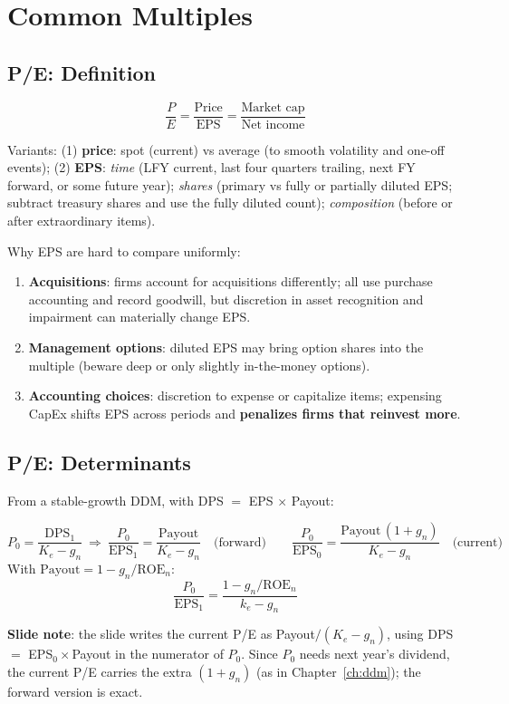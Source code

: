 \section{Common Multiples}

\subsection{P/E: Definition}
\begin{keybox}
\[
\frac{P}{E}=\frac{\text{Price}}{\text{EPS}}=\frac{\text{Market cap}}{\text{Net income}}
\]
\end{keybox}
Variants: (1) \textbf{price}: spot (current) vs average (to smooth volatility and one-off events); (2) \textbf{EPS}: \emph{time} (LFY current, last four quarters trailing, next FY forward, or some future year); \emph{shares} (primary vs fully or partially diluted EPS; subtract treasury shares and use the fully diluted count); \emph{composition} (before or after extraordinary items).

Why EPS are hard to compare uniformly:
\begin{enumerate}
  \item \textbf{Acquisitions}: firms account for acquisitions differently; all use purchase accounting and record goodwill, but discretion in asset recognition and impairment can materially change EPS.
  \item \textbf{Management options}: diluted EPS may bring option shares into the multiple (beware deep or only slightly in-the-money options).
  \item \textbf{Accounting choices}: discretion to expense or capitalize items; expensing CapEx shifts EPS across periods and \textbf{penalizes firms that reinvest more}.
\end{enumerate}

\subsection{P/E: Determinants}
From a stable-growth DDM, with DPS $=$ EPS $\times$ Payout:
\begin{keybox}
\[
P_0=\frac{\text{DPS}_1}{K_e-g_n}\ \Rightarrow\ \frac{P_0}{\text{EPS}_1}=\frac{\text{Payout}}{K_e-g_n}\quad\text{(forward)}\qquad\frac{P_0}{\text{EPS}_0}=\frac{\text{Payout}\,(1+g_n)}{K_e-g_n}\quad\text{(current)}
\]
With $\text{Payout}=1-g_n/\text{ROE}_n$:
\[
\frac{P_0}{\text{EPS}_1}=\frac{1-g_n/\text{ROE}_n}{k_e-g_n}
\]
\end{keybox}
\textcolor{keyred}{\textbf{Slide note}}: the slide writes the current P/E as Payout$/(K_e-g_n)$, using DPS $=$ EPS$_0\times$Payout in the numerator of $P_0$. Since $P_0$ needs next year's dividend, the current P/E carries the extra $(1+g_n)$ (as in Chapter~\ref{ch:ddm}); the forward version is exact.

